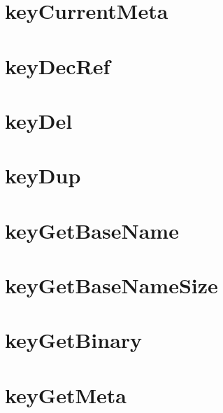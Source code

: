\let\mypdfximage\pdfximage\def\pdfximage{\immediate\mypdfximage}\documentclass[twoside]{book}
\newcommand{\+}{\discretionary{\mbox{\scriptsize$\hookleftarrow$}}{}{}}
\begin{document}
\chapter{key\+Current\+Meta}
\label{doc_contrib_api_reviews_core_keyCurrentMeta_md}

\chapter{key\+Dec\+Ref}
\label{doc_contrib_api_reviews_core_keyDecRef_md}

\chapter{key\+Del}
\label{doc_contrib_api_reviews_core_keyDel_md}

\chapter{key\+Dup}
\label{doc_contrib_api_reviews_core_keyDup_md}

\chapter{key\+Get\+Base\+Name}
\label{doc_contrib_api_reviews_core_keyGetBaseName_md}

\chapter{key\+Get\+Base\+Name\+Size}
\label{doc_contrib_api_reviews_core_keyGetBaseNameSize_md}

\chapter{key\+Get\+Binary}
\label{doc_contrib_api_reviews_core_keyGetBinary_md}

\chapter{key\+Get\+Meta}
\label{doc_contrib_api_reviews_core_keyGetMeta_md}

\end{document}
